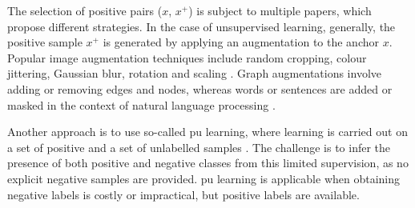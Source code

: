 The selection of positive pairs ($x$, $x^+$) is subject to multiple papers, 
which propose different strategies.
In the case of unsupervised learning, generally, 
the positive sample $x^+$ is generated by applying an augmentation to the anchor $x$.
Popular image augmentation techniques include random cropping, colour jittering, Gaussian blur,
rotation and scaling \citet{adversarial_2020,robinson_contrastive_2021,curricular_weighting_2024}.
Graph augmentations involve adding or removing edges and nodes, 
whereas words or sentences are added or masked in the context of natural language processing 
\citet{curricular_weighting_2024}.

Another approach is to use so-called \ac{pu} learning, where learning is carried out 
on a set of positive and a set of unlabelled samples \citet{chuang_debiased_2020}.
The challenge is to infer the presence of both positive and negative classes from this limited supervision, 
as no explicit negative samples are provided. 
\ac{pu} learning is applicable when obtaining negative labels is costly or impractical, 
but positive labels are available.